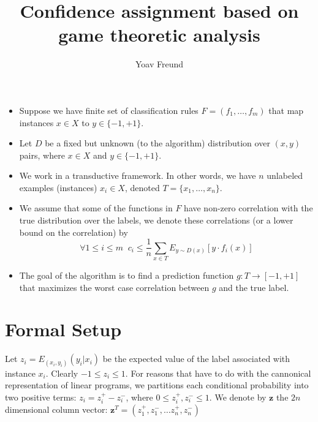 \documentclass{article}[12pt]
\title{Confidence assignment based on game theoretic analysis}
\author{Yoav Freund}
\begin{document}
\maketitle

\newcommand{\corr}{\mbox{corr}}
\newcommand{\Exy}[1]{E_{(x_i,y_i)}\left( #1 \right)} 
\newcommand{\ones}[1]{\mathbbm{1}^{#1}}
\newcommand{\vA}{\mathbf{A}}
\newcommand{\vF}{\mathbf{F}}
\newcommand{\vI}{\mathbf{I}}
\newcommand{\vb}{\mathbf{b}}
\newcommand{\vc}{\mathbf{c}}
\newcommand{\vd}{\mathbf{d}}
\newcommand{\vg}{\mathbf{g}}
\newcommand{\vr}{\mathbf{r}}
\newcommand{\vs}{\mathbf{s}}
\newcommand{\vv}{\mathbf{v}}
\newcommand{\vz}{\mathbf{z}}
\newcommand{\vzero}{\mathbf{0}}
\newcommand{\vone}{\mathbf{1}}

\begin{itemize}
\item Suppose we have finite set of classification rules $F=(f_1,\ldots,f_m)$
that map instances $x \in X$ to $y \in \{-1,+1\}$. 
\item
Let $D$ be a fixed but unknown (to the algorithm) distribution over
$(x,y)$ pairs, where $x \in X$ and $y \in \{-1,+1\}$.
\item
We work in a transductive framework. In other words, we have $n$
unlabeled examples (instances) $x_i \in X$, denoted
$T=\{x_1,\ldots,x_n\}$.
\item
We assume that some of the functions in $F$ have non-zero
correlation with the true distribution over the labels, we denote
these correlations (or a lower bound on the correlation) by
\[
\forall 1 \leq i \leq m\;\; c_i \leq \frac{1}{n} \sum_{x\in T} E_{y \sim D(x)}\left[ y\cdot f_i(x)\right]
\]
\item
The goal of the algorithm is to find a prediction function 
$g:T \to [-1,+1]$ that maximizes the worst case correlation between $g$ and the
true label.
\end{itemize}

\section{Formal Setup}
Let $z_i = \Exy{y_i | x_i}$ be the expected value of the label
associated with instance $x_i$. Clearly $-1 \leq z_i \leq 1$. For
reasons that have to do with the cannonical representation of linear
programs, we partitions each conditional probability into two positive
terms: $z_i=z_i^+ - z_i^-$, where $0 \leq z_i^+ , z_i^- \leq 1$. We
denote by $\vz$ the $2n$ dimensional column vector:
$\vz^T=(z_1^+,z_1^-,\ldots z_n^+,z_n^-)$
\end{document}
